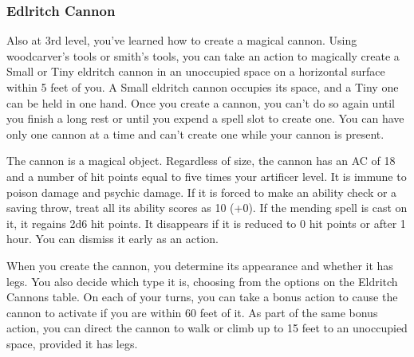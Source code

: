 {\subsubsection*{Edlritch Cannon}
Also at 3rd level, you've learned how to create a magical cannon. Using woodcarver's tools or smith's tools, you can take an action to magically create a Small or Tiny eldritch cannon in an unoccupied space on a horizontal surface within 5 feet of you. A Small eldritch cannon occupies its space, and a Tiny one can be held in one hand. Once you create a cannon, you can't do so again until you finish a long rest or until you expend a spell slot to create one. You can have only one cannon at a time and can't create one while your cannon is present.

The cannon is a magical object. Regardless of size, the cannon has an AC of 18 and a number of hit points equal to five times your artificer level. It is immune to poison damage and psychic damage. If it is forced to make an ability check or a saving throw, treat all its ability scores as 10 (+0). If the mending spell is cast on it, it regains 2d6 hit points. It disappears if it is reduced to 0 hit points or after 1 hour. You can dismiss it early as an action.

When you create the cannon, you determine its appearance and whether it has legs. You also decide which type it is, choosing from the options on the Eldritch Cannons table. On each of your turns, you can take a bonus action to cause the cannon to activate if you are within 60 feet of it. As part of the same bonus action, you can direct the cannon to walk or climb up to 15 feet to an unoccupied space, provided it has legs.
}
